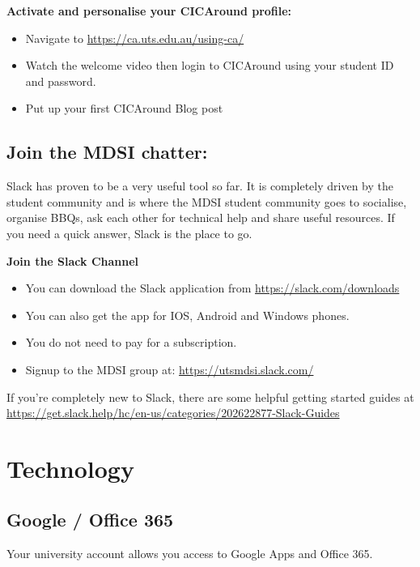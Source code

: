 \documentclass[]{book}
\providecommand{\tightlist}{%
  \setlength{\itemsep}{0pt}\setlength{\parskip}{0pt}}
\theoremstyle{definition}
\theoremstyle{definition}
\theoremstyle{remark}
\begin{document}
\textbf{Activate and personalise your CICAround profile:}

\begin{itemize}
\tightlist
\item
  Navigate to \url{https://ca.uts.edu.au/using-ca/}
\item
  Watch the welcome video then login to CICAround using your student ID
  and password.
\item
  Put up your first CICAround Blog post
\end{itemize}

\subsection{Join the MDSI chatter:}\label{join-the-mdsi-chatter}

Slack has proven to be a very useful tool so far. It is completely
driven by the student community and is where the MDSI student community
goes to socialise, organise BBQs, ask each other for technical help and
share useful resources. If you need a quick answer, Slack is the place
to go.

\textbf{Join the Slack Channel}

\begin{itemize}
\tightlist
\item
  You can download the Slack application from
  \url{https://slack.com/downloads}
\item
  You can also get the app for IOS, Android and Windows phones.
\item
  You do not need to pay for a subscription.
\item
  Signup to the MDSI group at: \url{https://utsmdsi.slack.com/}
\end{itemize}

If you're completely new to Slack, there are some helpful getting
started guides at
\url{https://get.slack.help/hc/en-us/categories/202622877-Slack-Guides}

\section{Technology}\label{technology}

\subsection{Google / Office 365}\label{google-office-365}

Your university account allows you access to Google Apps and Office 365.
\end{document}
